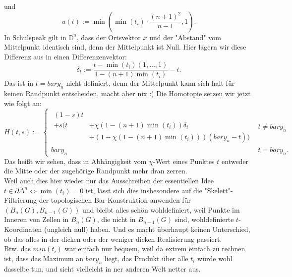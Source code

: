 \documentclass[11pt,twoside,a4paper]{scrbook} %
\begin{document}
und
$$u(t):=\min(\min(t_i)\cdot\frac{(n+1)^2}{n-1},1).$$
In Schulspeak gilt in $\mathbb{D}^n$, dass der Ortsvektor $x$ und der "Abstand" vom Mittelpunkt identisch sind, denn der Mittelpunkt ist Null. Hier lagern wir diese Differenz aus in einen Differenzenvektor:\\
$$\delta_t:=\frac{t-\min(t_i)(1,\ldots,1)}{1-(n+1)\min(t_i)} - t.$$
Das ist in $t = bary_n$ nicht definiert, denn der Mittelpunkt kann sich halt f\"ur keinen Randpunkt entscheiden, macht aber nix :) Die Homotopie setzen wir jetzt wie folgt an:
$$
H(t,s):=\begin{cases}{\begin{aligned}(1-s)t& \\
                         + s(t &+ \chi\left(1-(n+1)\min(t_i)\right)\delta_t \\
                               &+ \left(1-\chi(1-(n+1)\min(t_i))\right)(bary_n-t)) \end{aligned}}& t\neq bary_n
                     \\bary_n&t=bary_n.\end{cases}
$$
Das hei\ss t wir sehen, dass in Abh\"angigkeit vom $\chi$-Wert eines Punktes $t$ entweder die Mitte oder der zugeh\"orige Randpunkt mehr dran zerren.\\
Weil auch dies hier wieder nur das Ausschreiben der essentiellen Idee $t\in\partial \Delta^n \Leftrightarrow \min(t_i)=0$ ist, l\"asst sich dies insbesondere auf die "Skelett"-Filtrierung der
topologischen Bar-Konstruktion anwenden f\"ur $(B_n(G),B_{n-1}(G))$ und bleibt alles sch\"on wohldefiniert, weil Punkte im Inneren von Zellen in $B_n(G)$, die nicht in $B_{n-1}(G)$ sind, wohldefinierte
$t$-Koordinaten (ungleich null) haben. Und es macht \"uberhaupt keinen Unterschied, ob das alles in der dicken oder der weniger dicken Realisierung passiert.\\
Btw. das $min(t_i)$ war einfach nur bequem, weil da extrem einfach zu rechnen ist, dass das Maximum an $bary_n$ liegt, das Produkt \"uber alle $t_i$ w\"urde wohl dasselbe tun, und sieht vielleicht in 
ner anderen Welt netter aus.
\end{document}
